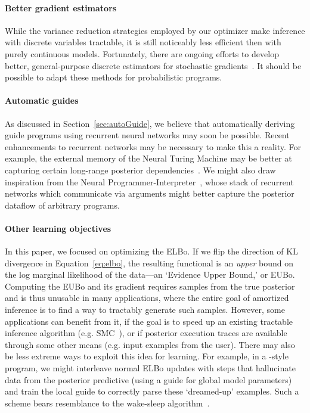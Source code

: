 \paragraph{Better gradient estimators}
While the variance reduction strategies employed by our optimizer make inference with discrete variables tractable, it is still noticeably less efficient then with purely continuous models.
Fortunately, there are ongoing efforts to develop better, general-purpose discrete estimators for stochastic gradients~\cite{MuProp,VIMCO}.
It should be possible to adapt these methods for probabilistic programs.

\paragraph{Automatic guides}
As discussed in Section~\ref{sec:autoGuide}, we believe that automatically deriving guide programs using recurrent neural networks may soon be possible.
Recent enhancements to recurrent networks may be necessary to make this a reality.
For example, the external memory of the Neural Turing Machine may be better at capturing certain long-range posterior dependencies~\cite{NTM}.
We might also draw inspiration from the Neural Programmer-Interpreter~\cite{NPI}, whose stack of recurrent networks which communicate via arguments might better capture the posterior dataflow of arbitrary programs.

\paragraph{Other learning objectives}
In this paper, we focused on optimizing the ELBo.
If we flip the direction of KL divergence in Equation~\ref{eq:elbo}, the resulting functional is an \emph{upper} bound on the log marginal likelihood of the data---an `Evidence Upper Bound,' or EUBo.
Computing the EUBo and its gradient requires samples from the true posterior and is thus unusable in many applications, where the entire goal of amortized inference is to find a way to tractably generate such samples.
However, some applications can benefit from it, if the goal is to speed up an existing tractable inference algorithm (e.g. SMC~\cite{NGPM}), or if posterior execution traces are available through some other means (e.g. input examples from the user).
There may also be less extreme ways to exploit this idea for learning.
For example, in a -style program, we might interleave normal ELBo updates with steps that hallucinate data from the posterior predictive (using a guide for global model parameters) and train the local guide to correctly parse these `dreamed-up' examples. Such a scheme bears resemblance to the wake-sleep algorithm~\cite{WakeSleep}.

